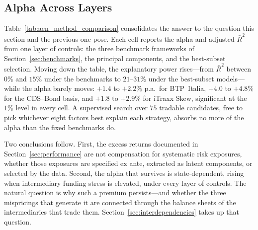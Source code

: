 \subsection{Alpha Across Layers}
\label{sec:factor_discussion}

Table~\ref{tab:aen_method_comparison} consolidates the answer to the
question this section and the previous one pose. Each cell reports the
alpha and adjusted $\bar{R}^2$ from one layer of controls: the three
benchmark frameworks of Section~\ref{sec:benchmarks}, the principal
components, and the best-subset selection. Moving down the table, the
explanatory power rises---from $\bar{R}^2$ between $0\%$ and $15\%$
under the benchmarks to $21$--$31\%$ under the best-subset
models---while the alpha barely moves: $+1.4$ to $+2.2\%$ p.a.\ for
BTP~Italia, $+4.0$ to $+4.8\%$ for the CDS--Bond basis, and $+1.8$ to
$+2.9\%$ for iTraxx Skew, significant at the $1\%$ level in every
cell. A supervised search over $75$ tradable candidates, free to pick
whichever eight factors best explain each strategy, absorbs no more of
the alpha than the fixed benchmarks do.

Two conclusions follow. First, the excess returns documented in
Section~\ref{sec:performance} are not compensation for systematic risk
exposures, whether those exposures are specified ex ante, extracted as
latent components, or selected by the data. Second, the alpha that
survives is state-dependent, rising when intermediary funding stress
is elevated, under every layer of controls. The natural question is
why such a premium persists---and whether the three mispricings that
generate it are connected through the balance sheets of the
intermediaries that trade them. Section~\ref{sec:interdependencies}
takes up that question.